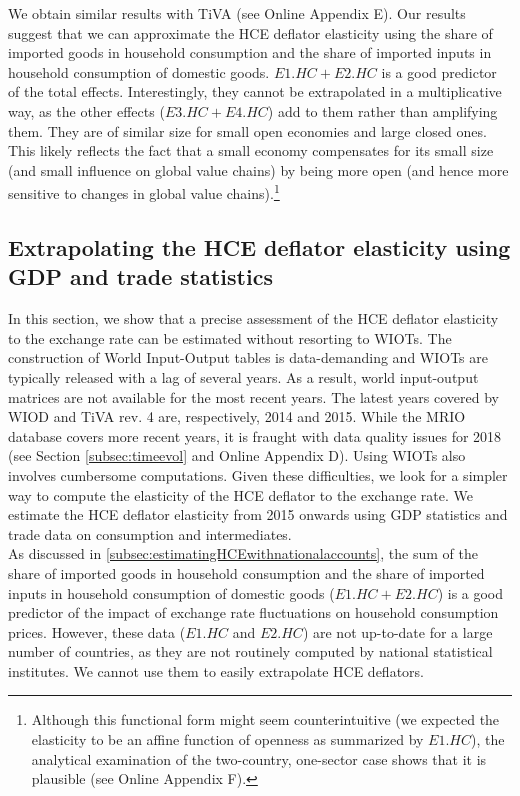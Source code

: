 \documentclass[11pt,a4paper]{paper} %
\begin{document}
We obtain similar results with TiVA (see Online Appendix E). 
Our results suggest that we can approximate the HCE deflator elasticity using the share of imported goods in household consumption and the share of imported inputs in household consumption of domestic goods. $E1.HC+E2.HC$ is a good predictor of the total effects.
Interestingly, they cannot be extrapolated in a multiplicative way, as the other effects ($E3.HC+E4.HC$) add to them rather than amplifying them.
They are of similar size for small open economies and large closed ones.
This likely reflects the fact that a small economy compensates for its small size (and small influence on global value chains) by being more open (and hence more sensitive to changes in global value chains).\footnote{Although this functional form might seem counterintuitive (we expected the elasticity to be an affine function of openness as summarized by $E1.HC$), the analytical examination of the two-country, one-sector case shows that it is plausible (see Online Appendix F).}

\subsection{Extrapolating the HCE deflator elasticity using GDP and trade statistics}\label{sec:Extrapolations}
In this section, we show that a precise assessment of the HCE deflator elasticity to the exchange rate can be estimated without resorting to WIOTs. 
The construction of World Input-Output tables is data-demanding and WIOTs are typically released with a lag of several years.
As a result, world input-output matrices are not available for the most recent years.
The latest years covered by WIOD and TiVA rev. 4 are, respectively, 2014 and 2015. 
While the MRIO database covers more recent years, it is fraught with data quality issues for 2018 (see Section \ref{subsec:timeevol} and Online Appendix D).
Using WIOTs also involves cumbersome computations.
Given these difficulties, we look for a simpler way to compute the elasticity of the HCE deflator to the exchange rate.
We estimate the HCE deflator elasticity from 2015 onwards using GDP statistics and trade data on consumption and intermediates.\\
As discussed in \ref{subsec:estimatingHCEwithnationalaccounts}, the sum of the share of imported goods in household consumption and the share of imported inputs in household consumption of domestic goods ($E1.HC + E2.HC$) is a good predictor of the impact of exchange rate fluctuations on household consumption prices. 
However, these data ($E1.HC$ and $E2.HC$) are not up-to-date for a large number of countries, as they are not routinely computed by national statistical institutes.
We cannot use them to easily extrapolate HCE deflators.
\end{document}
